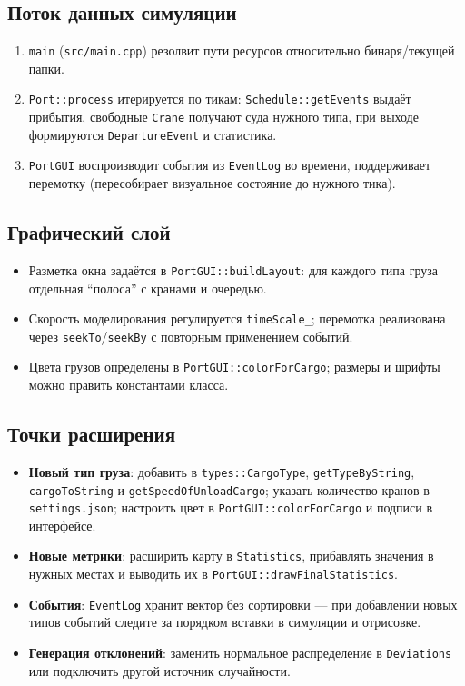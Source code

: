 \documentclass[12pt,a4paper]{article}
\begin{document}
\subsection{Поток данных симуляции}
\begin{enumerate}[noitemsep]
    \item \texttt{main} (\verb|src/main.cpp|) резолвит пути ресурсов относительно бинаря/текущей папки.
    \item \texttt{Port::process} итерируется по тикам: \texttt{Schedule::getEvents} выдаёт прибытия, свободные \texttt{Crane} получают суда нужного типа, при выходе формируются \texttt{DepartureEvent} и статистика.
    \item \texttt{PortGUI} воспроизводит события из \texttt{EventLog} во времени, поддерживает перемотку (пересобирает визуальное состояние до нужного тика).
\end{enumerate}

\subsection{Графический слой}
\begin{itemize}[noitemsep]
    \item Разметка окна задаётся в \verb|PortGUI::buildLayout|: для каждого типа груза отдельная ``полоса'' с кранами и очередью.
    \item Скорость моделирования регулируется \verb|timeScale_|; перемотка реализована через \verb|seekTo|/\verb|seekBy| с повторным применением событий.
    \item Цвета грузов определены в \verb|PortGUI::colorForCargo|; размеры и шрифты можно править константами класса.
\end{itemize}

\subsection{Точки расширения}
\begin{itemize}[noitemsep]
    \item \textbf{Новый тип груза}: добавить в \texttt{types::CargoType}, \texttt{getTypeByString}, \texttt{cargoToString} и \texttt{getSpeedOfUnloadCargo}; указать количество кранов в \verb|settings.json|; настроить цвет в \verb|PortGUI::colorForCargo| и подписи в интерфейсе.
    \item \textbf{Новые метрики}: расширить карту в \texttt{Statistics}, прибавлять значения в нужных местах и выводить их в \verb|PortGUI::drawFinalStatistics|.
    \item \textbf{События}: \texttt{EventLog} хранит вектор без сортировки — при добавлении новых типов событий следите за порядком вставки в симуляции и отрисовке.
    \item \textbf{Генерация отклонений}: заменить нормальное распределение в \verb|Deviations| или подключить другой источник случайности.
\end{itemize}
\end{document}
